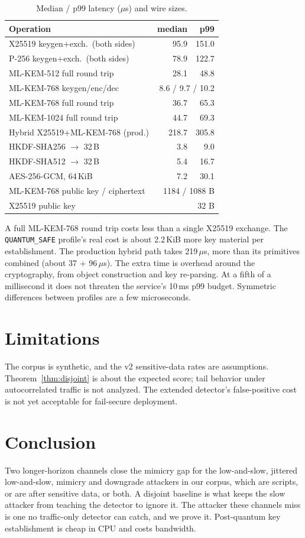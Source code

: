 \documentclass[conference]{IEEEtran}
\theoremstyle{remark}
\begin{document}
\begin{table}[t]
\centering
\caption{Median / p99 latency ($\mu$s) and wire sizes.}
\label{tab:pq}
\small
\begin{tabular}{@{}lrr@{}}
\toprule
Operation & median & p99\\
\midrule
X25519 keygen+exch.\ (both sides) & 95.9 & 151.0\\
P-256 keygen+exch.\ (both sides) & 78.9 & 122.7\\
ML-KEM-512 full round trip & 28.1 & 48.8\\
ML-KEM-768 keygen/enc/dec & \multicolumn{2}{r}{8.6 / 9.7 / 10.2}\\
ML-KEM-768 full round trip & 36.7 & 65.3\\
ML-KEM-1024 full round trip & 44.7 & 69.3\\
Hybrid X25519+ML-KEM-768 (prod.) & 218.7 & 305.8\\
HKDF-SHA256 $\to$ 32\,B & 3.8 & 9.0\\
HKDF-SHA512 $\to$ 32\,B & 5.4 & 16.7\\
AES-256-GCM, 64\,KiB & 7.2 & 30.1\\
\midrule
ML-KEM-768 public key / ciphertext & \multicolumn{2}{r}{1184 / 1088 B}\\
X25519 public key & \multicolumn{2}{r}{32 B}\\
\bottomrule
\end{tabular}
\end{table}

A full ML-KEM-768 round trip costs less than a single X25519 exchange. The \texttt{QUANTUM\_SAFE} profile's real cost is about 2.2\,KiB more key material per establishment. The production hybrid path takes 219\,$\mu$s, more than its primitives combined (about 37 + 96\,$\mu$s). The extra time is overhead around the cryptography, from object construction and key re-parsing. At a fifth of a millisecond it does not threaten the service's 10\,ms p99 budget. Symmetric differences between profiles are a few microseconds.

\section{Limitations}
The corpus is synthetic, and the v2 sensitive-data rates are assumptions. Theorem~\ref{thm:disjoint} is about the expected score; tail behavior under autocorrelated traffic is not analyzed. The extended detector's false-positive cost is not yet acceptable for fail-secure deployment.

\section{Conclusion}
Two longer-horizon channels close the mimicry gap for the low-and-slow, jittered low-and-slow, mimicry and downgrade attackers in our corpus, which are scripts, or are after sensitive data, or both. A disjoint baseline is what keeps the slow attacker from teaching the detector to ignore it. The attacker these channels miss is one no traffic-only detector can catch, and we prove it. Post-quantum key establishment is cheap in CPU and costs bandwidth.
\end{document}
